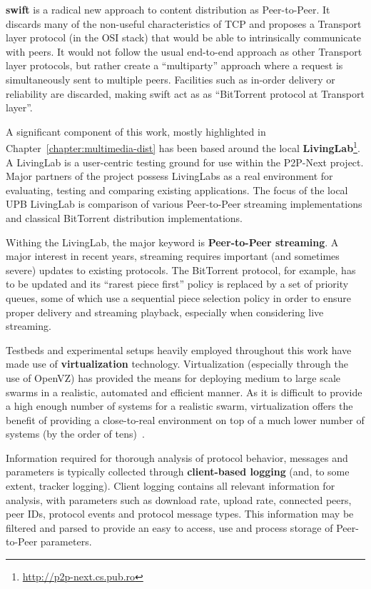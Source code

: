 \textbf{swift} is a radical new approach to content distribution as
Peer-to-Peer. It discards many of the non-useful characteristics of TCP and
proposes a Transport layer protocol (in the OSI stack) that would be able to
intrinsically communicate with peers. It would not follow the usual end-to-end
approach as other Transport layer protocols, but rather create a
``multiparty'' approach where a request is simultaneously sent to multiple
peers. Facilities such as in-order delivery or reliability are discarded,
making swift act as as ``BitTorrent protocol at Transport layer''.

A significant component of this work, mostly highlighted in
Chapter~\ref{chapter:multimedia-dist} has been based around the local
\textbf{LivingLab}\footnote{\url{http://p2p-next.cs.pub.ro}}. A LivingLab is a
user-centric testing ground for use within the P2P-Next project. Major
partners of the project possess LivingLabs as a real environment for
evaluating, testing and comparing existing applications. The focus of the
local UPB LivingLab is comparison of various Peer-to-Peer streaming
implementations and classical BitTorrent distribution implementations.

Withing the LivingLab, the major keyword is \textbf{Peer-to-Peer streaming}.
A major interest in recent years, streaming requires important (and sometimes
severe) updates to existing protocols. The BitTorrent protocol, for example,
has to be updated and its ``rarest piece first'' policy is replaced by a set
of priority queues\cite{bitos}, some of which use a sequential piece selection
policy in order to ensure proper delivery and streaming playback, especially
when considering live streaming.

Testbeds and experimental setups heavily employed throughout this work have
made use of \textbf{virtualization} technology. Virtualization (especially
through the use of OpenVZ) has provided the means for deploying medium to
large scale swarms in a realistic, automated and efficient manner. As it is
difficult to provide a high enough number of systems for a realistic swarm,
virtualization offers the benefit of providing a close-to-real environment
on top of a much lower number of systems (by the order of tens)~\cite{p2p-va}.

Information required for thorough analysis of protocol behavior, messages and
parameters is typically collected through \textbf{client-based logging} (and,
to some extent, tracker logging). Client logging contains all relevant
information for analysis, with parameters such as download rate, upload rate,
connected peers, peer IDs, protocol events and protocol message types. This
information may be filtered and parsed to provide an easy to access, use and
process storage of Peer-to-Peer parameters.

